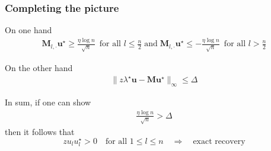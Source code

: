 \documentclass[compress,
mathserif,wide,%
]{beamer}
\begin{document}
%
%

\begin{frame}
	\frametitle{Completing the picture}
	On one hand 
	\begin{align*}
	 \bm{M}_{l,\cdot}\bm{u}^{\star}   \geq \frac{\eta \log n}{\sqrt{n}} \,\,\,\text{for all }l\leq \frac{n}{2}
	\;\text{and}\;
	   \bm{M}_{l,\cdot} \bm{u}^{\star}  
	\leq - \frac{\eta \log n}{\sqrt{n}} \,\,\, \text{for all } l > \frac{n}{2} 
\end{align*}

On the other hand	
	\begin{align*}
	\big\| z\lambda^{\star}\bm{u}-\bm{M}\bm{u}^{\star} \big\|_{\infty} \leq \Delta
	\end{align*}


In sum,  if one can show 
%
\begin{align}\label{eq:key-relation}
	\frac{\eta \log n}{\sqrt{n}}  > \Delta
\end{align}
%
then it follows that
%
\[
zu_{l} u_{l}^{\star}>0\quad\text{for all }1\leq l\leq n \quad \Longrightarrow \quad \text{exact recovery}
\]

\end{frame}
\end{document}
